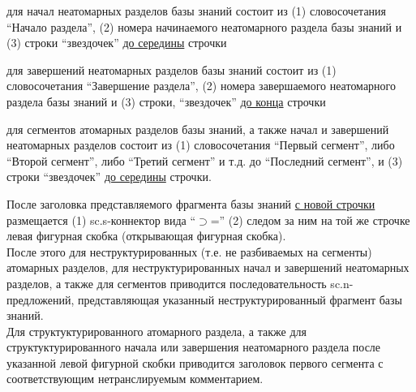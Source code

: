 \begin{SCn}
{\begin{scnitemize}
    \item для начал неатомарных разделов базы знаний состоит из (1) словосочетания ``Начало раздела'', (2) номера начинаемого неатомарного раздела базы знаний и (3) строки ``звездочек'' \uline{до середины} строчки
    \item для завершений неатомарных разделов базы знаний состоит из (1) словосочетания ``Завершение раздела'', (2) номера завершаемого неатомарного раздела базы знаний и (3) строки, ``звездочек'' \uline{до конца} строчки
    \item для сегментов атомарных разделов базы знаний, а также начал и завершений неатомарных разделов состоит из (1) словосочетания ``Первый сегмент'', либо ``Второй сегмент'', либо ``Третий сегмент'' и т.д. до ``Последний сегмент'', и (3) строки ``звездочек'' \uline{до середины} строчки.
\end{scnitemize}
После заголовка представляемого фрагмента базы знаний \uline{с новой строчки} размещается (1) sc.s-коннектор вида ``$\supset$='' (2) следом за ним на той же строчке левая фигурная скобка (открывающая фигурная скобка).\\
После этого для неструктурированных (т.е. не разбиваемых на сегменты) атомарных разделов, для неструктурированных начал и завершений неатомарных разделов, а также для сегментов приводится последовательность sc.n-предложений, представляющая указанный неструктурированный фрагмент базы знаний.\\
Для структуктурированного атомарного раздела, а также для структуктурированного начала или завершения неатомарного раздела после указанной левой фигурной скобки приводится заголовок первого сегмента с соответствующим нетранслируемым комментарием.\\
}
\end{SCn}
